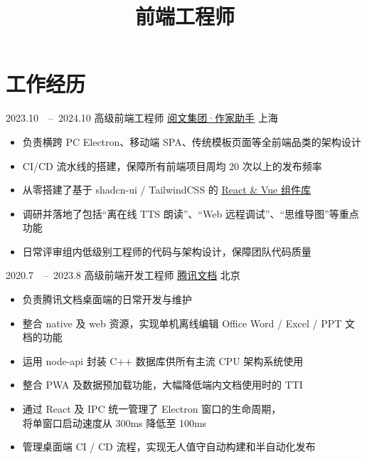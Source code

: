 \documentclass[12pt,a4paper,roman]{moderncv}   %
\title{前端工程师}                     %
\begin{document}
\maketitle


\section{工作经历}
\cventry
{2023.10\ \ –\ 2024.10}
{高级前端工程师}
{\href{https://write.qq.com}{\underline{阅文集团·作家助手}}}
{上海}
{}
{
  \begin{itemize}
  \item 负责横跨 PC Electron、移动端 SPA、传统模板页面等全前端品类的架构设计
  \item CI/CD 流水线的搭建，保障所有前端项目周均 20 次以上的发布频率
  \item 从零搭建了基于 shadcn-ui / TailwindCSS 的 \href{https://stawritecdn.yuewen.com/document/docs/components/index.html}{\underline{React \& Vue 组件库}}
  \item 调研并落地了包括“离在线 TTS 朗读”、“Web 远程调试”、“思维导图”等重点功能
  \item 日常评审组内低级别工程师的代码与架构设计，保障团队代码质量
  \end{itemize}
}

\vspace{5pt}

\cventry
{2020.7\ \ –\ 2023.8}
{高级前端开发工程师}
{\href{https://docs.qq.com}{\underline{腾讯文档}}}
{北京}
{}
{
  \begin{itemize}
  \item 负责腾讯文档桌面端的日常开发与维护
  \item 整合 native 及 web 资源，实现单机离线编辑 Office Word / Excel / PPT 文档的功能
  \item 运用 node-api 封装 C++ 数据库供所有主流 CPU 架构系统使用 
  \item 整合 PWA 及数据预加载功能，大幅降低端内文档使用时的 TTI
  \item 通过 React 及 IPC 统一管理了 Electron 窗口的生命周期，\\将单窗口启动速度从 300ms 降低至 100ms
  \item 管理桌面端 CI / CD 流程，实现无人值守自动构建和半自动化发布
  \end{itemize}
}
\end{document}
